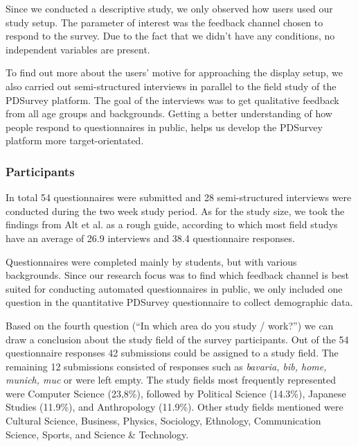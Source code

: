 	Since we conducted a descriptive study, we only observed how users used our study setup. The parameter of interest was the feedback channel chosen to respond to the survey. Due to the fact that we didn't have any conditions, no independent variables are present.


	To find out more about the users' motive for approaching the display setup, we also carried out semi-structured interviews in parallel to the field study of the PDSurvey platform. The goal of the interviews was to get qualitative feedback from all age groups and backgrounds. Getting a better understanding of how people respond to questionnaires in public, helps us develop the PDSurvey platform more target-orientated.




	\subsubsection{Participants} %

		In total 54 questionnaires were submitted and 28 semi-structured interviews were conducted during the two week study period. As for the study size, we took the findings from Alt et al.\cite{Alt2012HowToEvaluate} as a rough guide, according to which most field studys have an average of 26.9 interviews and 38.4 questionnaire responses.

		Questionnaires were completed mainly by students, but with various backgrounds. Since our research focus was to find which feedback channel is best suited for conducting automated questionnaires in public, we only included one question in the quantitative PDSurvey questionnaire to collect demographic data. 

		Based on the fourth question (``In which area do you study / work?'') we can draw a conclusion about the study field of the survey participants. Out of the 54 questionnaire responses 42 submissions could be assigned to a study field. The remaining 12 submissions consisted of responses such as \textit{bavaria, bib, home, munich, muc} or were left empty. The study fields most frequently represented were Computer Science (23,8\%), followed by Political Science (14.3\%), Japanese Studies (11.9\%), and Anthropology (11.9\%). Other study fields mentioned were Cultural Science, Business, Physics, Sociology, Ethnology, Communication Science, Sports, and Science \& Technology. 

